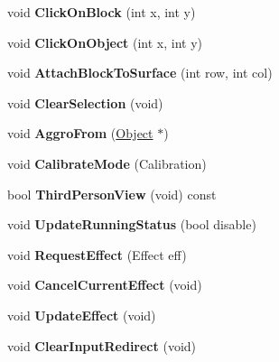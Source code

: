 \begin{DoxyCompactItemize}
\item 
\hypertarget{classgameDialog_a48b2f2b50db4bcd7bb5d859aa6731b07}{void {\bfseries \-Click\-On\-Block} (int x, int y)}\label{classgameDialog_a48b2f2b50db4bcd7bb5d859aa6731b07}

\item 
\hypertarget{classgameDialog_a0dc52082ffdd613057d57507b0f5f753}{void {\bfseries \-Click\-On\-Object} (int x, int y)}\label{classgameDialog_a0dc52082ffdd613057d57507b0f5f753}

\item 
\hypertarget{classgameDialog_abc1d0acda84d792d8c0bb3910bdc04d8}{void {\bfseries \-Attach\-Block\-To\-Surface} (int row, int col)}\label{classgameDialog_abc1d0acda84d792d8c0bb3910bdc04d8}

\item 
\hypertarget{classgameDialog_a1c0d45b906334858deb4c24ebe9685ab}{void {\bfseries \-Clear\-Selection} (void)}\label{classgameDialog_a1c0d45b906334858deb4c24ebe9685ab}

\item 
\hypertarget{classgameDialog_ae0dfad988d09e9b9fef312439c38ac13}{void {\bfseries \-Aggro\-From} (\hyperlink{classObject}{\-Object} $\ast$)}\label{classgameDialog_ae0dfad988d09e9b9fef312439c38ac13}

\item 
\hypertarget{classgameDialog_a578ed50dff9baa0c1751664c62c3feb9}{void {\bfseries \-Calibrate\-Mode} (\-Calibration)}\label{classgameDialog_a578ed50dff9baa0c1751664c62c3feb9}

\item 
\hypertarget{classgameDialog_ab99cb133d972356394df9a542f447ac7}{bool {\bfseries \-Third\-Person\-View} (void) const }\label{classgameDialog_ab99cb133d972356394df9a542f447ac7}

\item 
\hypertarget{classgameDialog_a9c0f282acabaab02ce168eb5d7b17327}{void {\bfseries \-Update\-Running\-Status} (bool disable)}\label{classgameDialog_a9c0f282acabaab02ce168eb5d7b17327}

\item 
\hypertarget{classgameDialog_a46ef262050295e930cd010ef0a7bf13f}{void {\bfseries \-Request\-Effect} (\-Effect eff)}\label{classgameDialog_a46ef262050295e930cd010ef0a7bf13f}

\item 
\hypertarget{classgameDialog_a8ceb2b685ea0de987194b22e5ae6fc8b}{void {\bfseries \-Cancel\-Current\-Effect} (void)}\label{classgameDialog_a8ceb2b685ea0de987194b22e5ae6fc8b}

\item 
\hypertarget{classgameDialog_ab095c6cac56d552e8b3a07511f1e2f3a}{void {\bfseries \-Update\-Effect} (void)}\label{classgameDialog_ab095c6cac56d552e8b3a07511f1e2f3a}

\item 
\hypertarget{classgameDialog_a6f84b2a49df351b6e9153a29aa342529}{void {\bfseries \-Clear\-Input\-Redirect} (void)}\label{classgameDialog_a6f84b2a49df351b6e9153a29aa342529}

\end{DoxyCompactItemize}
